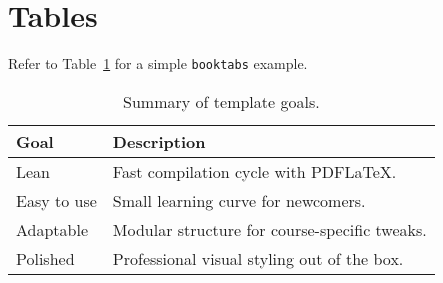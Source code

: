 \section{Tables}

Refer to Table~\ref{tab:summary} for a simple \texttt{booktabs} example.

\begin{table}[htbp]
  \centering
  \caption{Summary of template goals.}
  \label{tab:summary}
  \begin{tabular}{@{}ll@{}}
    \toprule
    Goal & Description \\
    \midrule
    Lean & Fast compilation cycle with PDFLaTeX. \\
    Easy to use & Small learning curve for newcomers. \\
    Adaptable & Modular structure for course-specific tweaks. \\
    Polished & Professional visual styling out of the box. \\
    \bottomrule
  \end{tabular}
\end{table}
